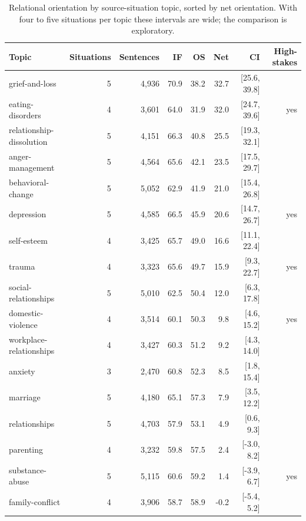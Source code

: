 \begin{table}[t]
\centering
\small
\caption{Relational orientation by source-situation topic, sorted by net orientation. With four to five situations per topic these intervals are wide; the comparison is exploratory.}
\label{tab:topic}
\begin{tabular}{lrrrrrrr}
\toprule
Topic & Situations & Sentences & IF & OS & Net & CI & High-stakes \\
\midrule
grief-and-loss & 5 & 4,936 & 70.9 & 38.2 & 32.7 & [25.6, 39.8] &  \\
eating-disorders & 4 & 3,601 & 64.0 & 31.9 & 32.0 & [24.7, 39.6] & yes \\
relationship-dissolution & 5 & 4,151 & 66.3 & 40.8 & 25.5 & [19.3, 32.1] &  \\
anger-management & 5 & 4,564 & 65.6 & 42.1 & 23.5 & [17.5, 29.7] &  \\
behavioral-change & 5 & 5,052 & 62.9 & 41.9 & 21.0 & [15.4, 26.8] &  \\
depression & 5 & 4,585 & 66.5 & 45.9 & 20.6 & [14.7, 26.7] & yes \\
self-esteem & 4 & 3,425 & 65.7 & 49.0 & 16.6 & [11.1, 22.4] &  \\
trauma & 4 & 3,323 & 65.6 & 49.7 & 15.9 & [9.3, 22.7] & yes \\
social-relationships & 5 & 5,010 & 62.5 & 50.4 & 12.0 & [6.3, 17.8] &  \\
domestic-violence & 4 & 3,514 & 60.1 & 50.3 & 9.8 & [4.6, 15.2] & yes \\
workplace-relationships & 4 & 3,427 & 60.3 & 51.2 & 9.2 & [4.3, 14.0] &  \\
anxiety & 3 & 2,470 & 60.8 & 52.3 & 8.5 & [1.8, 15.4] &  \\
marriage & 5 & 4,180 & 65.1 & 57.3 & 7.9 & [3.5, 12.2] &  \\
relationships & 5 & 4,703 & 57.9 & 53.1 & 4.9 & [0.6, 9.3] &  \\
parenting & 4 & 3,232 & 59.8 & 57.5 & 2.4 & [-3.0, 8.2] &  \\
substance-abuse & 5 & 5,115 & 60.6 & 59.2 & 1.4 & [-3.9, 6.7] & yes \\
family-conflict & 4 & 3,906 & 58.7 & 58.9 & -0.2 & [-5.4, 5.2] &  \\
\bottomrule
\end{tabular}
\end{table}
